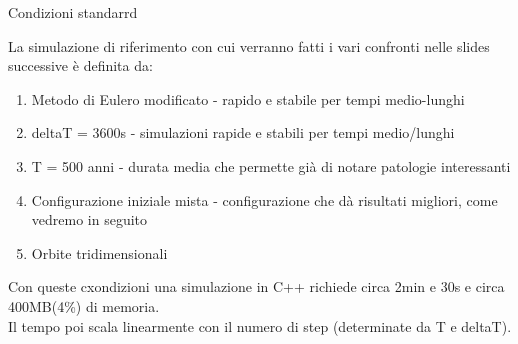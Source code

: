 \documentclass[Serif, 10pt, brown]{beamer}
\theoremstyle{example}
\theoremstyle{plain}
\begin{document}
    \begin{frame}{Condizioni standarrd}
        \begin{alertblock}{La simulazione di riferimento con cui verranno fatti i vari confronti nelle slides successive è definita da:}
            \begin{enumerate}[a]
                \item Metodo di Eulero modificato - rapido e stabile per tempi medio-lunghi
                \item deltaT = 3600s - simulazioni rapide e stabili per tempi medio/lunghi
                \item T = 500 anni - durata media che permette già di notare patologie interessanti
                \item Configurazione iniziale mista - configurazione che dà risultati migliori, come vedremo in seguito
                \item Orbite tridimensionali
            \end{enumerate}
            Con queste cxondizioni una simulazione in C++ richiede circa 2min e 30s e circa 400MB(4\%) di memoria.\\
            Il tempo poi scala linearmente con il numero di step (determinate da T e deltaT).
        \end{alertblock}
    \end{frame}
\end{document}
